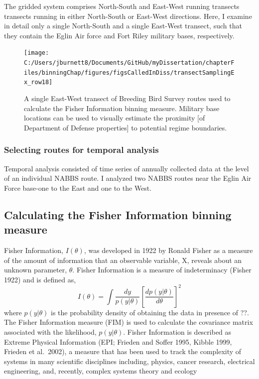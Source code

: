 \documentclass[12pt,twoside]{reedthesis}
\begin{document}
The gridded system comprises North-South and East-West running transects transects running in either North-South or East-West directions. Here, I examine in detail only a single North-South and a single East-West transect, such that they contain the Eglin Air force and Fort Riley military bases, respectively.
\begin{figure}

{\centering \texttt{[image: C:/Users/jburnett8/Documents/GitHub/myDissertation/chapterFiles/binningChap/figures/figsCalledInDiss/transectSamplingEx\_row18]} 

}

\caption{A single East-West transect of Breeding Bird Survey routes used to calculate the Fisher Information binning measure. Military base locations can be used to visually estimate the proximity [of Department of Defense properties] to potential regime boundaries.}\label{fig:ewRouteMap}
\end{figure}
\hypertarget{selecting-routes-for-temporal-analysis}{%
\subsubsection{Selecting routes for temporal analysis}\label{selecting-routes-for-temporal-analysis}}

Temporal analysis consisted of time series of annually collected data at the level of an individual NABBS route. I analyzed two NABBS routes near the Eglin Air Force base-one to the East and one to the West.

\hypertarget{calculating-the-fisher-information-binning-measure}{%
\subsection{Calculating the Fisher Information binning measure}\label{calculating-the-fisher-information-binning-measure}}

Fisher Information, \(I(\theta)\), was developed in 1922 by Ronald Fisher as a measure of the amount of information that an observable variable, X, reveals about an unknown parameter, \(\theta\). Fisher Information is a measure of indeterminacy (Fisher 1922) and is defined as,
\begin{equation} 
I(\theta) = \int \frac{dy}{p(y|\theta)}\left[\frac{dp(y|\theta)}{d\theta}\right]^2
\label{eq:fiGeneral1922}
\end{equation}
where \(p(y|\theta)\) is the probability density of obtaining the data in presence of ??. The Fisher Information measure (FIM) is used to calculate the covariance matrix associated with the likelihood, \(p(y|\theta)\). Fisher Information is described as Extreme Physical Information (EPI; Frieden and Soffer 1995, Kibble 1999, Frieden et al.~2002), a measure that has been used to track the complexity of systems in many scientific disciplines including, physics, cancer research, electrical engineering, and, recently, complex systems theory and ecology
\end{document}
